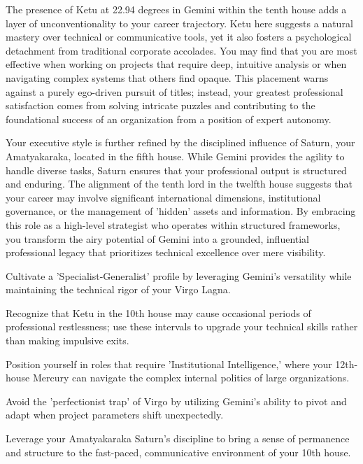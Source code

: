 {\fontsize{9}{13}\selectfont The presence of Ketu at 22.94 degrees in Gemini within the tenth house adds a layer of unconventionality to your career trajectory. Ketu here suggests a natural mastery over technical or communicative tools, yet it also fosters a psychological detachment from traditional corporate accolades. You may find that you are most effective when working on projects that require deep, intuitive analysis or when navigating complex systems that others find opaque. This placement warns against a purely ego-driven pursuit of titles; instead, your greatest professional satisfaction comes from solving intricate puzzles and contributing to the foundational success of an organization from a position of expert autonomy.}\par\vspace{1.8mm}

{\fontsize{9}{13}\selectfont Your executive style is further refined by the disciplined influence of Saturn, your Amatyakaraka, located in the fifth house. While Gemini provides the agility to handle diverse tasks, Saturn ensures that your professional output is structured and enduring. The alignment of the tenth lord in the twelfth house suggests that your career may involve significant international dimensions, institutional governance, or the management of 'hidden' assets and information. By embracing this role as a high-level strategist who operates within structured frameworks, you transform the airy potential of Gemini into a grounded, influential professional legacy that prioritizes technical excellence over mere visibility.}\par\vspace{1.8mm}

\begin{diamondlist}
  \item {\fontsize{8.5}{12}\selectfont Cultivate a 'Specialist-Generalist' profile by leveraging Gemini's versatility while maintaining the technical rigor of your Virgo Lagna.}
  \item {\fontsize{8.5}{12}\selectfont Recognize that Ketu in the 10th house may cause occasional periods of professional restlessness; use these intervals to upgrade your technical skills rather than making impulsive exits.}
  \item {\fontsize{8.5}{12}\selectfont Position yourself in roles that require 'Institutional Intelligence,' where your 12th-house Mercury can navigate the complex internal politics of large organizations.}
  \item {\fontsize{8.5}{12}\selectfont Avoid the 'perfectionist trap' of Virgo by utilizing Gemini's ability to pivot and adapt when project parameters shift unexpectedly.}
  \item {\fontsize{8.5}{12}\selectfont Leverage your Amatyakaraka Saturn's discipline to bring a sense of permanence and structure to the fast-paced, communicative environment of your 10th house.}
\end{diamondlist}

